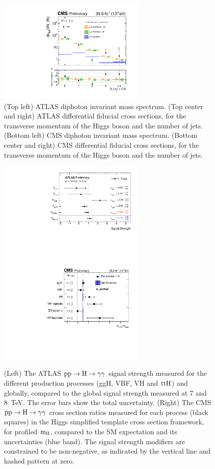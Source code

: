 \documentclass[10pt]{article}
\begin{document}
\begin{figure}[htb]
\includegraphics[height=2in]{figures/CMS-HIG-17-015__Figure_004-b__njets.pdf}
\caption{
  (Top left) ATLAS diphoton invariant mass spectrum.
  (Top center and right) ATLAS differential fiducial cross sections, for the
  transverse momentum of the Higgs boson and the number of jets.
  (Bottom left) CMS diphoton invariant mass spectrum.
  (Bottom center and right) CMS differential fiducial cross sections, for the
  transverse momentum of the Higgs boson and the number of jets.
}
\label{fig:figure-gg}
\end{figure}


\begin{figure}[htb]
\centering
\includegraphics[height=2in]{figures/ATLAS-CONF-2016-067__fig_14__mu.pdf}
\includegraphics[height=2in]{figures/CMS-HIG-16-040__Figure_017__mu.pdf}
\caption{
  (Left) The ATLAS ${\rm pp\to H\to \gamma\gamma}$ signal strength measured for
  the different production processes (ggH, VBF, VH and ${\rm ttH}$) and
  globally, compared to the global signal strength measured at 7 and 8~TeV. The
  error bars show the total uncertainty.
  (Right) The CMS ${\rm pp\to H\to \gamma\gamma}$ cross section ratios measured
  for each process (black squares) in the Higgs simplified template cross section
  framework, for profiled ${\rm m_H}$, compared to the SM expectation and its
  uncertainties (blue band). The signal strength modifiers are constrained to be
  non-negative, as indicated by the vertical line and hashed pattern at zero.
}
\label{fig:figure-gg-2}
\end{figure}
\end{document}

